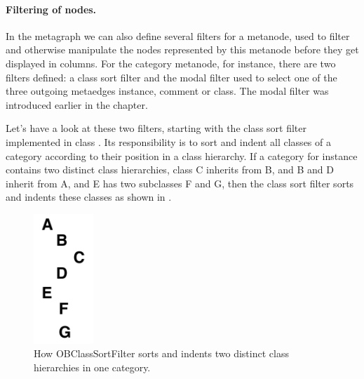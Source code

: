 \documentclass[a4paper,10pt,twoside]{book}
\begin{document}

\paragraph{Filtering of nodes.}

In the metagraph we can also define several filters for a metanode, used to filter and otherwise manipulate the nodes represented by this metanode before they get displayed in columns. For the category metanode, for instance, there are two filters defined: a class sort filter and the modal filter used to select one of the three outgoing metaedges instance, comment or class. The modal filter was introduced earlier in the chapter.

Let's have a look at these two filters, starting with the class sort filter implemented in class . Its responsibility is to sort and indent all classes of a category according to their position in a class hierarchy. If a category for instance contains two distinct class hierarchies, \eg class C inherits from B, and B and D inherit from A, and E has two subclasses F and G, then the class sort filter sorts and indents these classes as shown in .

\begin{figure}[!ht]
\begin{center}
\includegraphics[width=0.2\textwidth]{classSortFilter}
\caption{How OBClassSortFilter sorts and indents two distinct class hierarchies in one category.} 
\end{center}
\end{figure}
\end{document}
